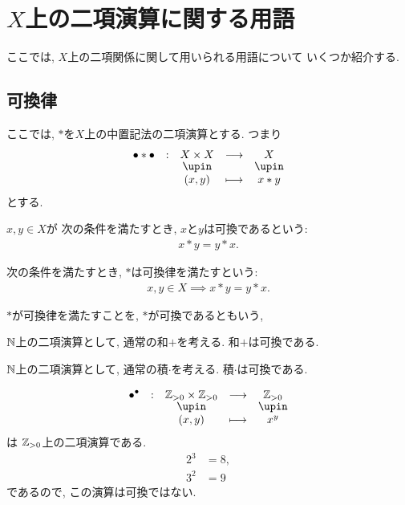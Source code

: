 \chapter{$X$上の二項演算に関する用語}
ここでは, $X$上の二項関係に関して用いられる用語について
いくつか紹介する.

\section{可換律}
ここでは,
$\ast$を$X$上の中置記法の二項演算とする.
つまり
\begin{align*}
  \shazo{\tofu\ast\tofu}
        {X\times X}{X}
        {(x,y)}{x\ast y}
\end{align*}
とする.
\begin{definition}
  $x,y\in X$が
  次の条件を満たすとき,
  $x$と$y$は可換であるという:
  \begin{align*}
    x\ast y=y\ast x.
  \end{align*}
\end{definition}
\begin{definition}
  次の条件を満たすとき,
  $\ast$は可換律を満たすという:
  \begin{align*}
    x,y\in X\implies x\ast y=y\ast x.
  \end{align*}
\end{definition}
\begin{remark}
  $\ast$が可換律を満たすことを,
  $\ast$が可換であるともいう,
\end{remark}
\begin{example}
  $\mathbb{N}$上の二項演算として,
  通常の和$+$を考える.
  和$+$は可換である.
\end{example}
\begin{example}
  $\mathbb{N}$上の二項演算として,
  通常の積$\cdot$を考える.
  積$\cdot$は可換である.
\end{example}
\begin{nonexample}
\begin{align*}
  \shazo{\tofu^\tofu}
        {\ZZ_{>0}\times \ZZ_{>0}}{\ZZ_{>0}}
        {(x,y)}{x^y}
\end{align*}
は
$\mathbb{Z}_{>0}$上の二項演算である.
\begin{align*}
  2^3&=8,\\
  3^2&=9
\end{align*}
であるので,
この演算は可換ではない.
\end{nonexample}
